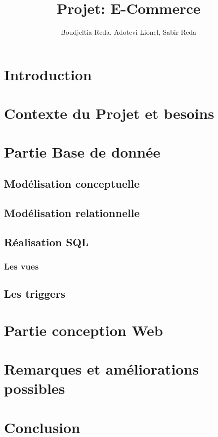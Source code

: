 \documentclass[11pt]{report}
\title{\LARGE Projet: E-Commerce }
\author{Boudjeltia Reda, Adotevi Lionel, Sabir Reda }
\begin{document}
    \maketitle
   
    \tableofcontents


\chapter*{Introduction}
    
      
\chapter{Contexte du Projet et besoins}


\chapter{Partie Base de donn\'ee}
   
    \section{Mod\'elisation conceptuelle}
    \section{Mod\'elisation relationnelle}
    \section{R\'ealisation SQL}
    \subsection{Les vues}
    \section{Les triggers}
   
   
\chapter{Partie conception Web}

\section{}
\subsection{}



\chapter{Remarques et am\'eliorations possibles}

  

    
    



\chapter{Conclusion}
\end{document}
